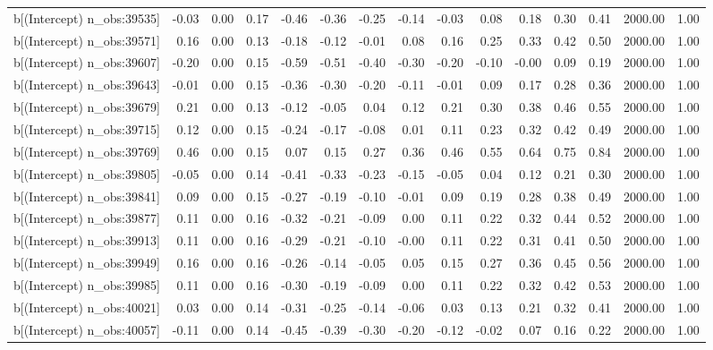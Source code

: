 \begin{table}[ht]
\begin{tabular}{rrrrrrrrrrrrrrr}
  b[(Intercept) n\_obs:39535] & -0.03 & 0.00 & 0.17 & -0.46 & -0.36 & -0.25 & -0.14 & -0.03 & 0.08 & 0.18 & 0.30 & 0.41 & 2000.00 & 1.00 \\ 
  b[(Intercept) n\_obs:39571] & 0.16 & 0.00 & 0.13 & -0.18 & -0.12 & -0.01 & 0.08 & 0.16 & 0.25 & 0.33 & 0.42 & 0.50 & 2000.00 & 1.00 \\ 
  b[(Intercept) n\_obs:39607] & -0.20 & 0.00 & 0.15 & -0.59 & -0.51 & -0.40 & -0.30 & -0.20 & -0.10 & -0.00 & 0.09 & 0.19 & 2000.00 & 1.00 \\ 
  b[(Intercept) n\_obs:39643] & -0.01 & 0.00 & 0.15 & -0.36 & -0.30 & -0.20 & -0.11 & -0.01 & 0.09 & 0.17 & 0.28 & 0.36 & 2000.00 & 1.00 \\ 
  b[(Intercept) n\_obs:39679] & 0.21 & 0.00 & 0.13 & -0.12 & -0.05 & 0.04 & 0.12 & 0.21 & 0.30 & 0.38 & 0.46 & 0.55 & 2000.00 & 1.00 \\ 
  b[(Intercept) n\_obs:39715] & 0.12 & 0.00 & 0.15 & -0.24 & -0.17 & -0.08 & 0.01 & 0.11 & 0.23 & 0.32 & 0.42 & 0.49 & 2000.00 & 1.00 \\ 
  b[(Intercept) n\_obs:39769] & 0.46 & 0.00 & 0.15 & 0.07 & 0.15 & 0.27 & 0.36 & 0.46 & 0.55 & 0.64 & 0.75 & 0.84 & 2000.00 & 1.00 \\ 
  b[(Intercept) n\_obs:39805] & -0.05 & 0.00 & 0.14 & -0.41 & -0.33 & -0.23 & -0.15 & -0.05 & 0.04 & 0.12 & 0.21 & 0.30 & 2000.00 & 1.00 \\ 
  b[(Intercept) n\_obs:39841] & 0.09 & 0.00 & 0.15 & -0.27 & -0.19 & -0.10 & -0.01 & 0.09 & 0.19 & 0.28 & 0.38 & 0.49 & 2000.00 & 1.00 \\ 
  b[(Intercept) n\_obs:39877] & 0.11 & 0.00 & 0.16 & -0.32 & -0.21 & -0.09 & 0.00 & 0.11 & 0.22 & 0.32 & 0.44 & 0.52 & 2000.00 & 1.00 \\ 
  b[(Intercept) n\_obs:39913] & 0.11 & 0.00 & 0.16 & -0.29 & -0.21 & -0.10 & -0.00 & 0.11 & 0.22 & 0.31 & 0.41 & 0.50 & 2000.00 & 1.00 \\ 
  b[(Intercept) n\_obs:39949] & 0.16 & 0.00 & 0.16 & -0.26 & -0.14 & -0.05 & 0.05 & 0.15 & 0.27 & 0.36 & 0.45 & 0.56 & 2000.00 & 1.00 \\ 
  b[(Intercept) n\_obs:39985] & 0.11 & 0.00 & 0.16 & -0.30 & -0.19 & -0.09 & 0.00 & 0.11 & 0.22 & 0.32 & 0.42 & 0.53 & 2000.00 & 1.00 \\ 
  b[(Intercept) n\_obs:40021] & 0.03 & 0.00 & 0.14 & -0.31 & -0.25 & -0.14 & -0.06 & 0.03 & 0.13 & 0.21 & 0.32 & 0.41 & 2000.00 & 1.00 \\ 
  b[(Intercept) n\_obs:40057] & -0.11 & 0.00 & 0.14 & -0.45 & -0.39 & -0.30 & -0.20 & -0.12 & -0.02 & 0.07 & 0.16 & 0.22 & 2000.00 & 1.00 \\ 

\end{tabular}
\end{table}
